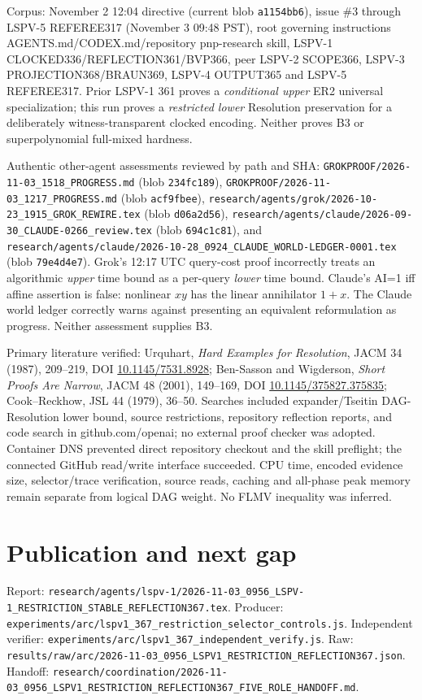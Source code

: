 \documentclass[11pt]{article}
\begin{document}
Corpus: November 2 12:04 directive (current blob \texttt{a1154bb6}), issue \#3 through LSPV-5 REFEREE317 (November 3 09:48 PST), root governing instructions AGENTS.md/CODEX.md/repository pnp-research skill, LSPV-1 CLOCKED336/REFLECTION361/BVP366, peer LSPV-2 SCOPE366, LSPV-3 PROJECTION368/BRAUN369, LSPV-4 OUTPUT365 and LSPV-5 REFEREE317. Prior LSPV-1 361 proves a \emph{conditional upper} ER2 universal specialization; this run proves a \emph{restricted lower} Resolution preservation for a deliberately witness-transparent clocked encoding. Neither proves B3 or superpolynomial full-mixed hardness.

Authentic other-agent assessments reviewed by path and SHA: \texttt{GROKPROOF/2026-11-03\_1518\_PROGRESS.md} (blob \texttt{234fc189}), \texttt{GROKPROOF/2026-11-03\_1217\_PROGRESS.md} (blob \texttt{acf9fbee}), \texttt{research/agents/grok/2026-10-23\_1915\_GROK\_REWIRE.tex} (blob \texttt{d06a2d56}), \texttt{research/agents/claude/2026-09-30\_CLAUDE-0266\_review.tex} (blob \texttt{694c1c81}), and \texttt{research/agents/claude/2026-10-28\_0924\_CLAUDE\_WORLD-LEDGER-0001.tex} (blob \texttt{79e4d4e7}). Grok's 12:17 UTC query-cost proof incorrectly treats an algorithmic \emph{upper} time bound as a per-query \emph{lower} time bound. Claude's AI=1 iff affine assertion is false: nonlinear \(xy\) has the linear annihilator \(1+x\). The Claude world ledger correctly warns against presenting an equivalent reformulation as progress. Neither assessment supplies B3.

Primary literature verified: Urquhart, \emph{Hard Examples for Resolution}, JACM 34 (1987), 209--219, DOI \href{https://doi.org/10.1145/7531.8928}{10.1145/7531.8928}; Ben-Sasson and Wigderson, \emph{Short Proofs Are Narrow}, JACM 48 (2001), 149--169, DOI \href{https://doi.org/10.1145/375827.375835}{10.1145/375827.375835}; Cook--Reckhow, JSL 44 (1979), 36--50. Searches included expander/Tseitin DAG-Resolution lower bound, source restrictions, repository reflection reports, and code search in github.com/openai; no external proof checker was adopted. Container DNS prevented direct repository checkout and the skill preflight; the connected GitHub read/write interface succeeded. CPU time, encoded evidence size, selector/trace verification, source reads, caching and all-phase peak memory remain separate from logical DAG weight. No FLMV inequality was inferred.

\section*{Publication and next gap}
Report: \texttt{research/agents/lspv-1/2026-11-03\_0956\_LSPV-1\_RESTRICTION\_STABLE\_REFLECTION367.tex}.
Producer: \texttt{experiments/arc/lspv1\_367\_restriction\_selector\_controls.js}. Independent verifier: \texttt{experiments/arc/lspv1\_367\_independent\_verify.js}. Raw: \texttt{results/raw/arc/2026-11-03\_0956\_LSPV1\_RESTRICTION\_REFLECTION367.json}. Handoff: \texttt{research/coordination/2026-11-03\_0956\_LSPV1\_RESTRICTION\_REFLECTION367\_FIVE\_ROLE\_HANDOFF.md}.
\end{document}
